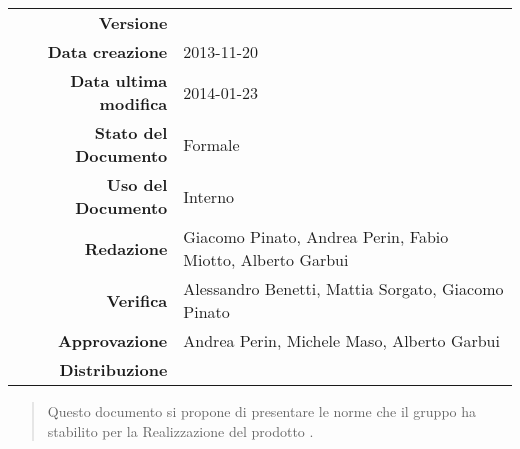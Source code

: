 



\newcommand{\Versione}{\versioneNormeDiProgetto{}}	%
\newcommand{\Data}{2013-11-20}						%
\newcommand{\DataUltimaModifica}{2014-01-23}
\newcommand{\TipoDocumento}{Norme di Progetto}		%



\begin{center}
\begin{tabular}{r|l}
\textbf{Versione} & \Versione{} \\
\textbf{Data creazione} & \Data{} \\
\textbf{Data ultima modifica} & \DataUltimaModifica{} \\
\textbf{Stato del Documento} & Formale \\		%
\textbf{Uso del Documento} & Interno \\			%
\textbf{Redazione} & Giacomo Pinato, Andrea Perin, Fabio Miotto, Alberto Garbui\\			%
\textbf{Verifica} & Alessandro Benetti, Mattia Sorgato, Giacomo Pinato\\			%
\textbf{Approvazione} & Andrea Perin, Michele Maso, Alberto Garbui\\				%
\textbf{Distribuzione} & \parbox[t]{4cm}{\NomeGruppo{}}\\
\end{tabular}
\end{center}

\vspace{0.05in}

\begin{abstract}
\begin{center}
Questo documento si propone di presentare le norme che il gruppo \textbf{\NomeGruppo{}} ha stabilito per la Realizzazione del prodotto \textbf{\Progetto{}}.
\end{center}
\end{abstract}

